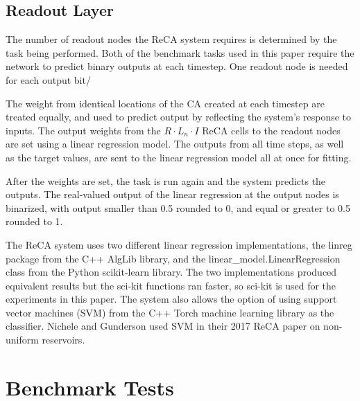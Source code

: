 \documentclass{elsarticle}
\begin{document}
\begin{multicols}{2}
\subsection{Readout Layer}
The number of readout nodes the ReCA system requires is determined by the task 
being  performed. Both of the benchmark tasks used in this paper require the 
network to predict binary outputs at each timestep. One readout node is needed 
for each output bit/ \par The weight from identical locations of the CA created 
   at each timestep are treated equally, and used to predict output by 
      reflecting the system's response to inputs. The output weights from the 
      $R \cdot L_{n} \cdot I$ ReCA cells to the readout nodes are set using a 
      linear regression model.  The outputs from all time steps, as well as the 
      target values, are sent to the linear regression model all at once for 
      fitting.  \par
After the weights are set, the task is run again and the system predicts the 
outputs. The real-valued output of the linear regression at the output nodes is 
binarized, with output smaller than 0.5 rounded to 0, and equal or greater to 
0.5 rounded to 1. \par The ReCA system uses two different linear regression 
implementations, the linreg package from the C++ AlgLib library, and the 
linear\_model.LinearRegression class from the Python scikit-learn library.  The 
two implementations produced equivalent results but the sci-kit functions ran 
faster, so sci-kit is used for the experiments in this paper. The system also 
allows the option of  using support vector machines (SVM) from the C++ Torch 
machine learning library as the classifier.  Nichele and 
Gunderson used SVM in their 2017 ReCA paper on non-uniform 
reservoirs\cite{nichele2017reservoir}.

\section{Benchmark Tests}\label{Benchmarks}

\end{multicols}
\end{document}
